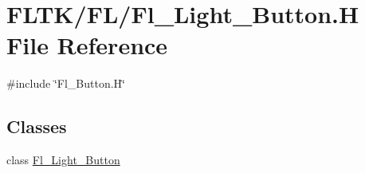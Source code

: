 \hypertarget{_fl___light___button_8_h}{}\section{F\+L\+T\+K/\+F\+L/\+Fl\+\_\+\+Light\+\_\+\+Button.H File Reference}
\label{_fl___light___button_8_h}
{\ttfamily \#include \char`\"{}Fl\+\_\+\+Button.\+H\char`\"{}}\newline
\subsection*{Classes}
\begin{DoxyCompactItemize}
\item 
class \hyperlink{class_fl___light___button}{Fl\+\_\+\+Light\+\_\+\+Button}
\end{DoxyCompactItemize}
